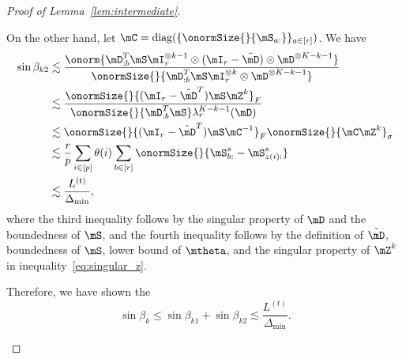 \documentclass[lettersize,onecolumn,journal]{IEEEtran}
\theoremstyle{definition}
\theoremstyle{definition}
\def\fixme#1#2{\textbf{\color{red}[FIXME (#1): #2]}}
\begin{document}
\begin{proof}[Proof of Lemma~\ref{lem:intermediate}]
\begin{enumerate}
    On the other hand, let $\mC = \text{diag}(\{\onormSize{}{\mS_{a:}}\}_{a \in [r]})$. We have 
    \begin{align}
        \sin \beta_{k2} &\lesssim \frac{ \onorm{\mD_{:b}^{T} \mS \mI_r^{\otimes k-1} \otimes (\mI_r - \tilde \mD) \otimes \mD^{\otimes K-k-1} } }{\onormSize{}{\mD_{:b}^{T} \mS \mI_r^{\otimes k} \otimes \mD^{\otimes K-k-1} }  }\\
        & \lesssim \frac{ \onormSize{}{(\mI_r - \tilde \mD^T) \mS \mZ^k}_F }{\onormSize{}{\mD_{:b}^{T} \mS} \lambda_r^{K-k-1}(\mD)} \\
        & \lesssim \onormSize{ }{(\mI_r - \tilde \mD^T) \mS \mC^{-1}}_F \onormSize{}{\mC \mZ^k}_{\sigma}\\
        & \lesssim \frac{r}{p} \sum_{i \in [p]} \theta(i) \sum_{b \in [r]} \onormSize{}{\mS_{b:}^s - \mS_{z(i):}^s} \\
        & \lesssim \frac{L^{(t)}}{\Delta_{\min}}, 
    \end{align}
    where the third inequality follows by the singular property of $\mD$ and the boundedness of $\mS$, and the fourth inequality follows by the definition of $\tilde \mD$, boundedness of $\mS$, lower bound of $\mtheta$, and the singular property of $\mZ^k$ in inequality~\eqref{eq:singular_z}. 
    
    Therefore, we have shown the 
    \begin{equation}
        \sin \beta_k \leq \sin \beta_{k1} + \sin \beta_{k2} \lesssim \frac{L^{(t)}}{\Delta_{\min}}.
    \end{equation}

    
   
    
    

\end{enumerate}
\end{proof}
\end{document}
